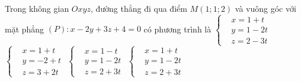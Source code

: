 \begin{ex}%
	Trong không gian $Oxyz$, đường thẳng đi qua điểm $M(1;1;2)$ và vuông góc với mặt phẳng $(P)\colon x-2y+3z+4=0$ có phương trình là
	\choice
	{$\left\{\begin{aligned}
		&x=1+t \\
		&y=1-2t \\
		&z=2-3t
		\end{aligned}\right. $}
	{$\left\{\begin{aligned}
		&x=1+t \\
		&y=-2+t \\
		&z=3+2t
		\end{aligned}\right. $}
	{$\left\{\begin{aligned}
		&x=1-t \\
		&y=1-2t \\
		&z=2+3t
		\end{aligned}\right. $}
	{\True $\left\{\begin{aligned}
		&x=1+t \\
		&y=1-2t \\
		&z=2+3t
		\end{aligned}\right. $}
\end{ex}

